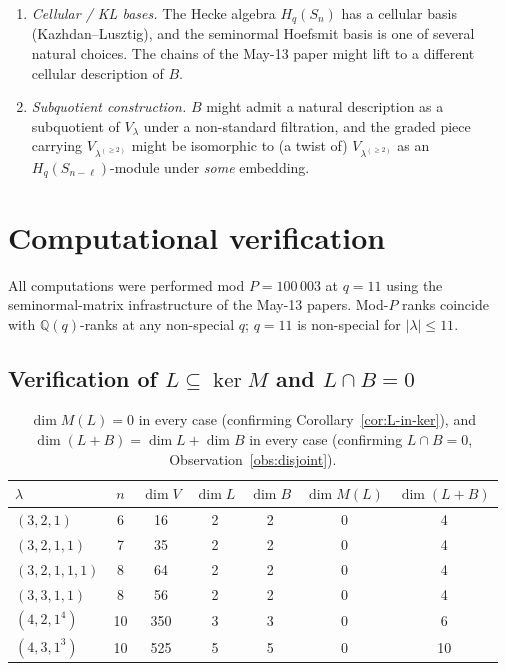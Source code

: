 \documentclass[11pt]{article}
\theoremstyle{definition}
\begin{document}
\begin{enumerate}[leftmargin=2em,topsep=0.3em,itemsep=0.3em]
\begin{enumerate}[label=(\roman*),topsep=0.2em,itemsep=0.1em]
\item \emph{Cellular / KL bases.} The Hecke algebra $H_q(S_n)$ has a
cellular basis (Kazhdan--Lusztig), and the seminormal Hoefsmit basis
is one of several natural choices. The chains of the May-13 paper
might lift to a different cellular description of $B$.

\item \emph{Subquotient construction.} $B$ might admit a natural
description as a subquotient of $V_\lambda$ under a non-standard
filtration, and the graded piece carrying $V_{\lambda^{(\ge 2)}}$ might
be isomorphic to (a twist of) $V_{\lambda^{(\ge 2)}}$ as an
$H_q(S_{n-\ell})$-module under \emph{some} embedding.
\end{enumerate}
\end{enumerate}

\section{Computational verification}\label{sec:data}

All computations were performed mod $P = 100\,003$ at $q = 11$ using
the seminormal-matrix infrastructure of the May-13 papers. Mod-$P$
ranks coincide with $\mathbb{Q}(q)$-ranks at any non-special $q$;
$q = 11$ is non-special for $|\lambda| \le 11$.

\subsection{Verification of $L \subseteq \ker M$ and $L \cap B = 0$}

\begin{table}[h]
\centering
\renewcommand{\arraystretch}{1.15}
\begin{tabular}{l|c|c|c|c|c|c}
\toprule
$\lambda$ & $n$ & $\dim V$ & $\dim L$ & $\dim B$ & $\dim M(L)$ & $\dim(L + B)$ \\
\midrule
$(3, 2, 1)$        & 6  & 16  & 2 & 2 & 0 & 4 \\
$(3, 2, 1, 1)$     & 7  & 35  & 2 & 2 & 0 & 4 \\
$(3, 2, 1, 1, 1)$  & 8  & 64  & 2 & 2 & 0 & 4 \\
$(3, 3, 1, 1)$     & 8  & 56  & 2 & 2 & 0 & 4 \\
$(4, 2, 1^4)$      & 10 & 350 & 3 & 3 & 0 & 6 \\
$(4, 3, 1^3)$      & 10 & 525 & 5 & 5 & 0 & 10 \\
\bottomrule
\end{tabular}
\caption{$\dim M(L) = 0$ in every case (confirming
Corollary~\ref{cor:L-in-ker}), and $\dim(L + B) = \dim L + \dim B$
in every case (confirming $L \cap B = 0$,
Observation~\ref{obs:disjoint}).}
\label{tab:LB-data}
\end{table}
\end{document}
